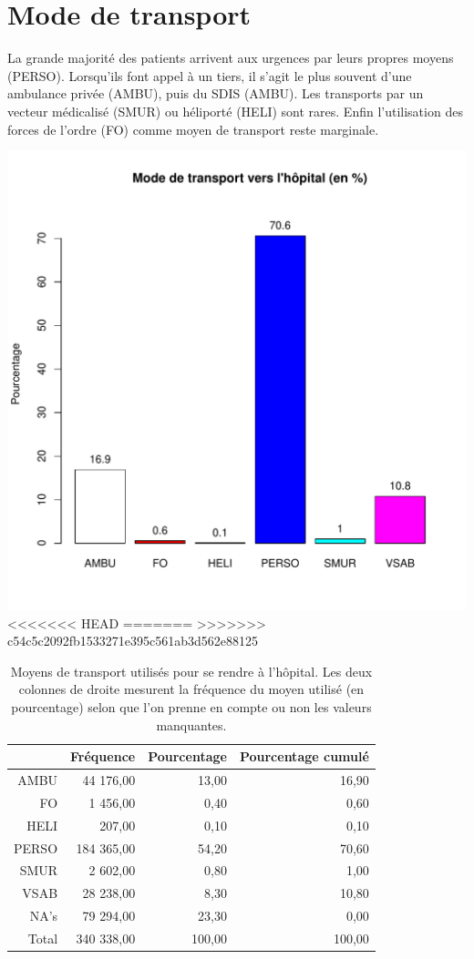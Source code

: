 \documentclass[12pt,english,french,twoside]{book}\usepackage[]{graphicx}\usepackage[]{color}
\makeatletter
\def\maxwidth{ %
  \ifdim\Gin@nat@width>\linewidth
    \linewidth
  \else
    \Gin@nat@width
  \fi
}
\makeatother
\begin{document}
\section*{Mode de transport}

La grande majorité des patients arrivent aux urgences par leurs propres moyens (PERSO). Lorsqu'ils font appel à un tiers, il s'agit le plus souvent d'une ambulance privée (AMBU), puis du SDIS (AMBU). Les transports par un vecteur médicalisé (SMUR) ou héliporté (HELI) sont rares. Enfin l'utilisation des forces de l'ordre (FO) comme moyen de transport reste marginale.


\includegraphics[width=\maxwidth]{figure/transport} 
<<<<<<< HEAD
=======
>>>>>>> c54c5c2092fb1533271e395c561ab3d562e88125
\begin{table}[ht]
\centering
\begin{tabular}{rrrr}
  \hline
 & Fréquence & Pourcentage & Pourcentage cumulé \\ 
  \hline
AMBU & 44 176,00 & 13,00 & 16,90 \\ 
  FO & 1 456,00 & 0,40 & 0,60 \\ 
  HELI & 207,00 & 0,10 & 0,10 \\ 
  PERSO & 184 365,00 & 54,20 & 70,60 \\ 
  SMUR & 2 602,00 & 0,80 & 1,00 \\ 
  VSAB & 28 238,00 & 8,30 & 10,80 \\ 
  NA's & 79 294,00 & 23,30 & 0,00 \\ 
    Total & 340 338,00 & 100,00 & 100,00 \\ 
   \hline
\end{tabular}
\caption[Moyens de transport]{Moyens de transport utilisés pour se rendre à l'hôpital. Les deux colonnes de droite mesurent la fréquence du moyen utilisé (en pourcentage) selon que l'on prenne en compte ou non les valeurs manquantes. } 
\label{transport}
\end{table}
\end{document}
